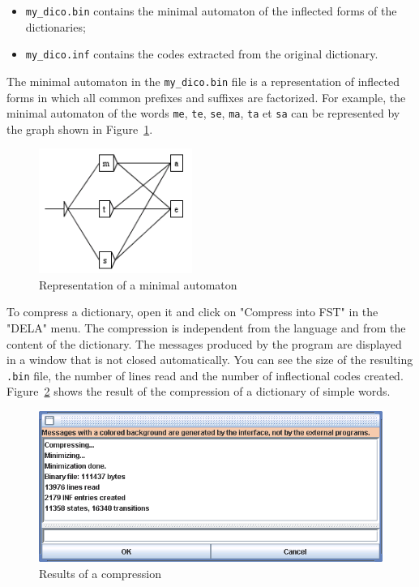 \begin{itemize}
  \item \verb+my_dico.bin+ contains the minimal automaton of the inflected forms of the dictionaries;
  \item \verb+my_dico.inf+ contains the codes extracted from the original dictionary.
\end{itemize}

\noindent The minimal automaton in the \verb+my_dico.bin+ file is a
representation of inflected forms in which all common prefixes and suffixes are factorized. For
example, the minimal automaton of the words \verb+me+, \verb+te+, \verb+se+,
\verb+ma+, \verb+ta+ et \verb+sa+ can be represented by the graph shown in
Figure~\ref{fig-example-minimal-automaton}. \bigskip \begin{figure}[!h]
\begin{center}
\includegraphics[width=5cm]{resources/img/fig3-10.png}
\caption{Representation of a minimal
automaton\label{fig-example-minimal-automaton}}
\end{center}
\end{figure}

\noindent To compress a dictionary, open it and click on "Compress into FST" in
the "DELA" menu. The compression is independent from the language and from the content of
the dictionary. The messages produced by the program are displayed in a window
that is not closed automatically. You can see the size of the resulting
\verb+.bin+ file, the number of lines read and the number of inflectional codes
created. Figure~\ref{fig-compression-result} shows the result of
the compression of a dictionary of simple words. \bigskip
\begin{figure}[!h]
\begin{center}
\includegraphics[width=14cm]{resources/img/fig3-11.png}
\caption{Results of a compression\label{fig-compression-result}}
\end{center}
\end{figure}


